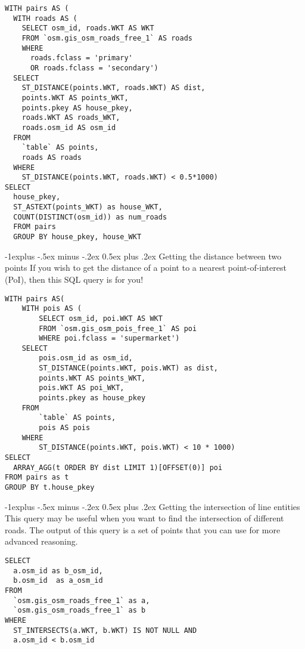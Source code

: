 \documentclass[10pt,landscape]{article}
\makeatletter
\renewcommand{\subsection}{\@startsection{subsection}{2}{0mm}%
                                {-1explus -.5ex minus -.2ex}%
                                {0.5ex plus .2ex}%
                                {\normalfont\normalsize\bfseries}}
\makeatother
\begin{document}
\begin{multicols}{3}
\begin{lstlisting}
WITH pairs AS (
  WITH roads AS (
    SELECT osm_id, roads.WKT AS WKT
    FROM `osm.gis_osm_roads_free_1` AS roads
    WHERE
      roads.fclass = 'primary'
      OR roads.fclass = 'secondary')
  SELECT
    ST_DISTANCE(points.WKT, roads.WKT) AS dist,
    points.WKT AS points_WKT,
    points.pkey AS house_pkey,
    roads.WKT AS roads_WKT,
    roads.osm_id AS osm_id
  FROM
    `table` AS points,
    roads AS roads
  WHERE
    ST_DISTANCE(points.WKT, roads.WKT) < 0.5*1000)
SELECT
  house_pkey,
  ST_ASTEXT(points_WKT) as house_WKT,
  COUNT(DISTINCT(osm_id)) as num_roads
  FROM pairs
  GROUP BY house_pkey, house_WKT
\end{lstlisting}

\subsection{Getting the distance between two points} If you wish to get the
distance of a point to a nearest point-of-interest (PoI), then this SQL query
is for you!

\begin{lstlisting}
WITH pairs AS(
    WITH pois AS (
        SELECT osm_id, poi.WKT AS WKT
        FROM `osm.gis_osm_pois_free_1` AS poi
        WHERE poi.fclass = 'supermarket')
    SELECT
        pois.osm_id as osm_id,
        ST_DISTANCE(points.WKT, pois.WKT) as dist,
        points.WKT AS points_WKT,
        pois.WKT AS poi_WKT,
        points.pkey as house_pkey
    FROM
        `table` AS points,
        pois AS pois
    WHERE
        ST_DISTANCE(points.WKT, pois.WKT) < 10 * 1000)
SELECT
  ARRAY_AGG(t ORDER BY dist LIMIT 1)[OFFSET(0)] poi
FROM pairs as t
GROUP BY t.house_pkey
\end{lstlisting}

\subsection{Getting the intersection of line entities} This query may
be useful when you want to find the intersection of different roads. The output
of this query is a set of points that you can use for more advanced reasoning.

\begin{lstlisting}
SELECT
  a.osm_id as b_osm_id, 
  b.osm_id  as a_osm_id 
FROM
  `osm.gis_osm_roads_free_1` as a,
  `osm.gis_osm_roads_free_1` as b
WHERE
  ST_INTERSECTS(a.WKT, b.WKT) IS NOT NULL AND
  a.osm_id < b.osm_id
\end{lstlisting}


\end{multicols}
\end{document}
